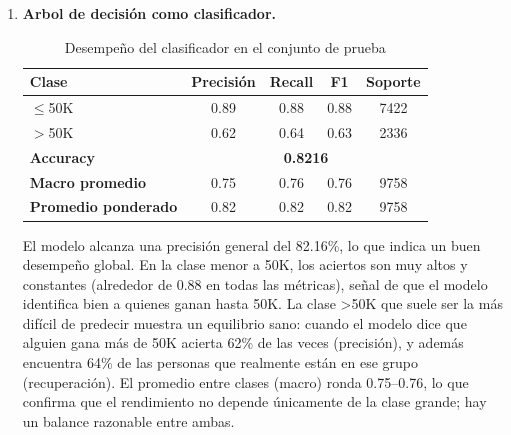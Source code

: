 \documentclass[12pt,a4paper]{article}
\begin{document}
\begin{enumerate}
\begin{itemize}
      Si se busca buen desempeño general y pocas falsas alarmas en \texttt{>50K}, \texttt{(education-num, capital-gain)} es la mejor base.
      Si se quiere aumentar el \emph{recall} de \texttt{>50K}, podría moverse el umbral de decisión y/o da más peso a esa clase, sobre todo en parejas 
      con \texttt{capital-gain}. Por último, añadir una tercera variable (p. ej., \texttt{age} o \texttt{hours-per-week}) probablemente ayudaría a mejorar el 
      \emph{recall} de \texttt{>50K}, siempre que también ajustes el umbral o el peso entre clases.
    \end{itemize}

    \item \textbf{Arbol de decisión como clasificador.}
    
    \begin{table}[H]
      \centering
      \small
        \begin{tabular}{lcccc}
        \toprule
        \textbf{Clase} & \textbf{Precisión} & \textbf{Recall} & \textbf{F1} & \textbf{Soporte} \\
        \midrule
        $\leq$50K & 0.89 & 0.88 & 0.88 & 7422 \\
        $>$50K    & 0.62 & 0.64 & 0.63 & 2336 \\
        \midrule
        \textbf{Accuracy} & \multicolumn{4}{c}{\textbf{0.8216}} \\
        \midrule
        \textbf{Macro promedio}    & 0.75 & 0.76 & 0.76 & 9758 \\
        \textbf{Promedio ponderado} & 0.82 & 0.82 & 0.82 & 9758 \\
        \bottomrule
        \end{tabular}
        \caption{Desempeño del clasificador en el conjunto de prueba}
        \label{tab:clasificador_global}
    \end{table}
    
    El modelo alcanza una precisión general del 82.16\%, lo que indica un buen desempeño global. En la clase menor a 50K, los aciertos 
    son muy altos y constantes (alrededor de 0.88 en todas las métricas), señal de que el modelo identifica bien a quienes ganan hasta 50K. 
    La clase >50K que suele ser la más difícil de predecir muestra un equilibrio sano: cuando el modelo dice que alguien gana más de 50K acierta 62\% 
    de las veces (precisión), y además encuentra 64\% de las personas que realmente están en ese grupo (recuperación). El promedio entre 
    clases (macro) ronda 0.75–0.76, lo que confirma que el rendimiento no depende únicamente de la clase grande; hay un balance razonable 
    entre ambas.


\end{enumerate}
\end{document}
